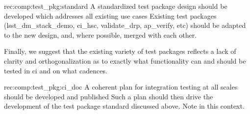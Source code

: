 \begin{recommendation}
  {rec:comp:test_pkg:standard}
  {A standardized test package design should be developed which addresses all existing use cases}
Existing test packages (lsst\_dm\_stack\_demo, ci\_hsc, validate\_drp, ap\_verify, etc) should be adapted to the new design, and, where possible, merged with each other.
\end{recommendation}

Finally, we suggest that the existing variety of test packages reflects a lack of clarity and orthogonalization as to exactly what functionality can and should be tested in \gls{ci} and on what cadences.

\begin{recommendation}
  {rec:comp:test_pkg:ci_doc}
  {A coherent plan for integration testing at all scales should be developed and published}
Such a plan should then drive the development of the test package standard discussed above.
Note  in this context.
\end{recommendation}
